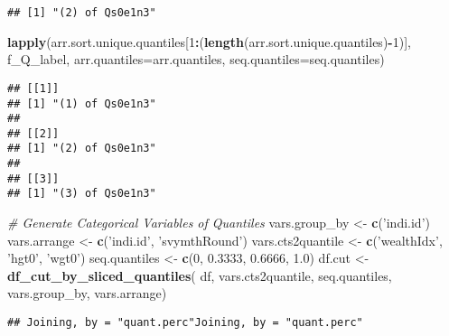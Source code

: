 \documentclass[
]{article}
\newenvironment{Shaded}{\begin{snugshade}}{\end{snugshade}}
\newcommand{\CommentTok}[1]{\textcolor[rgb]{0.56,0.35,0.01}{\textit{#1}}}
\newcommand{\DataTypeTok}[1]{\textcolor[rgb]{0.13,0.29,0.53}{#1}}
\newcommand{\DecValTok}[1]{\textcolor[rgb]{0.00,0.00,0.81}{#1}}
\newcommand{\FloatTok}[1]{\textcolor[rgb]{0.00,0.00,0.81}{#1}}
\newcommand{\KeywordTok}[1]{\textcolor[rgb]{0.13,0.29,0.53}{\textbf{#1}}}
\newcommand{\NormalTok}[1]{#1}
\newcommand{\OperatorTok}[1]{\textcolor[rgb]{0.81,0.36,0.00}{\textbf{#1}}}
\newcommand{\StringTok}[1]{\textcolor[rgb]{0.31,0.60,0.02}{#1}}
\begin{document}
\begin{verbatim}
## [1] "(2) of Qs0e1n3"
\end{verbatim}

\begin{Shaded}
\begin{Highlighting}[]
\KeywordTok{lapply}\NormalTok{(arr.sort.unique.quantiles[}\DecValTok{1}\OperatorTok{:}\NormalTok{(}\KeywordTok{length}\NormalTok{(arr.sort.unique.quantiles)}\OperatorTok{-}\DecValTok{1}\NormalTok{)],}
\NormalTok{       f_Q_label,}
       \DataTypeTok{arr.quantiles=}\NormalTok{arr.quantiles,}
       \DataTypeTok{seq.quantiles=}\NormalTok{seq.quantiles)}
\end{Highlighting}
\end{Shaded}

\begin{verbatim}
## [[1]]
## [1] "(1) of Qs0e1n3"
## 
## [[2]]
## [1] "(2) of Qs0e1n3"
## 
## [[3]]
## [1] "(3) of Qs0e1n3"
\end{verbatim}

\begin{Shaded}
\begin{Highlighting}[]
\CommentTok{# Generate Categorical Variables of Quantiles}
\NormalTok{vars.group_by <-}\StringTok{ }\KeywordTok{c}\NormalTok{(}\StringTok{'indi.id'}\NormalTok{)}
\NormalTok{vars.arrange <-}\StringTok{ }\KeywordTok{c}\NormalTok{(}\StringTok{'indi.id'}\NormalTok{, }\StringTok{'svymthRound'}\NormalTok{)}
\NormalTok{vars.cts2quantile <-}\StringTok{ }\KeywordTok{c}\NormalTok{(}\StringTok{'wealthIdx'}\NormalTok{, }\StringTok{'hgt0'}\NormalTok{, }\StringTok{'wgt0'}\NormalTok{)}
\NormalTok{seq.quantiles <-}\StringTok{ }\KeywordTok{c}\NormalTok{(}\DecValTok{0}\NormalTok{, }\FloatTok{0.3333}\NormalTok{, }\FloatTok{0.6666}\NormalTok{, }\FloatTok{1.0}\NormalTok{)}
\NormalTok{df.cut <-}\StringTok{ }\KeywordTok{df_cut_by_sliced_quantiles}\NormalTok{(}
\NormalTok{  df, vars.cts2quantile, seq.quantiles, vars.group_by, vars.arrange)}
\end{Highlighting}
\end{Shaded}

\begin{verbatim}
## Joining, by = "quant.perc"Joining, by = "quant.perc"
\end{verbatim}

\begin{Shaded}
\end{Shaded}
\end{document}
